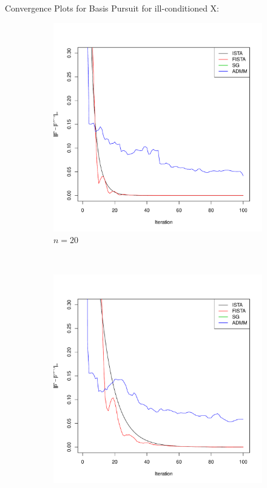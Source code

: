 \documentclass[xcolor=dvipsnames,aspectratio=1610]{beamer}
\theoremstyle{remark}
\begin{document}
\begin{frame}{Convergence Plots for Basis Pursuit for ill-conditioned X:}
\fontsize{6pt}{7.2}\selectfont
\begin{figure}[H]
  \centering
    \begin{subfigure}[b]{0.2\textwidth}
        \includegraphics[width=\textwidth]{20cvgc-cn.pdf}
        \caption{$n=20$}
        \label{fig:20}
    \end{subfigure}
~
    \begin{subfigure}[b]{0.2\textwidth}
        \includegraphics[width=\textwidth]{50cvgc-cn.pdf}

\end{subfigure}
\end{figure}
\end{frame}
\end{document}
